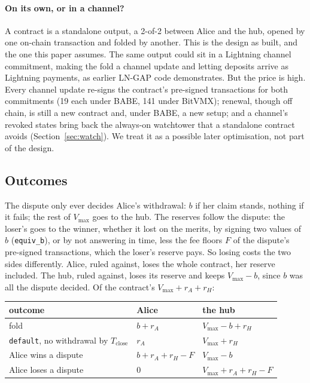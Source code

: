 \documentclass[11pt]{article}
\newcommand{\vmax}{V_{\max}}
\newcommand{\Tc}{T_{\mathrm{close}}}
\newcommand{\tx}[1]{\texttt{#1}}
\begin{document}
\paragraph{On its own, or in a channel?} A contract is a standalone
output, a 2-of-2 between Alice and the hub, opened by one on-chain
transaction and folded by another. This is the design as built, and the
one this paper assumes. The same output could sit in a Lightning channel
commitment, making the fold a channel update and letting deposits arrive
as Lightning payments, as earlier LN-GAP code demonstrates. But the
price is high. Every channel update re-signs the contract's pre-signed
transactions for both commitments (19 each under BABE, 141 under
BitVMX); renewal,
though off chain, is still a new contract and, under BABE, a new setup;
and a channel's revoked states bring back the always-on watchtower that a
standalone contract avoids (Section~\ref{sec:watch}). We treat it as a
possible later optimisation, not part of the design.

\subsection{Outcomes}
\label{sec:outcomes}

The dispute only ever decides Alice's withdrawal: $b$ if her claim
stands, nothing if it fails; the rest of $\vmax$ goes to the hub. The
reserves follow the dispute: the loser's goes to the winner, whether
it lost on the merits, by signing two values of $b$ (\tx{equiv\_b}), or
by not answering in time, less the fee floors $F$ of the dispute's
pre-signed transactions, which the loser's reserve pays. So losing costs
the two sides differently. Alice, ruled against, loses the whole
contract, her reserve included. The hub, ruled against, loses its
reserve and keeps $\vmax - b$, since $b$ was all the dispute decided. Of
the contract's $\vmax + r_A + r_H$:
\begin{center}
\small
\begin{tabular}{lll}
\toprule
outcome & Alice & the hub \\
\midrule
fold & $b + r_A$ & $\vmax - b + r_H$ \\
\tx{default}, no withdrawal by $\Tc$ & $r_A$ & $\vmax + r_H$ \\
Alice wins a dispute & $b + r_A + r_H - F$ & $\vmax - b$ \\
Alice loses a dispute & $0$ & $\vmax + r_A + r_H - F$ \\
\bottomrule
\end{tabular}
\end{center}
\end{document}
